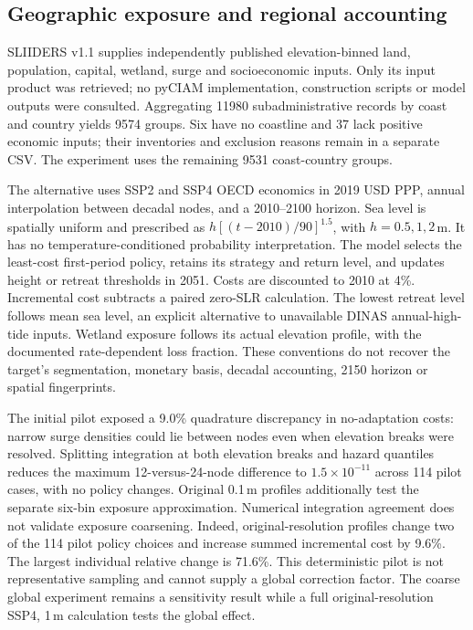 \subsection{Geographic exposure and regional accounting}
SLIIDERS v1.1 supplies independently published elevation-binned land, population,
capital, wetland, surge and socioeconomic inputs\cite{sliiders}. Only its input
product was retrieved; no pyCIAM implementation, construction scripts or model
outputs were consulted. Aggregating 11980 subadministrative records by coast
and country yields 9574 groups. Six have no coastline and 37 lack positive
economic inputs; their inventories and exclusion reasons remain in a separate
CSV. The experiment uses the remaining 9531 coast-country groups.

The alternative uses SSP2 and SSP4 OECD economics in 2019 USD PPP, annual
interpolation between decadal nodes, and a 2010--2100 horizon. Sea level is
spatially uniform and prescribed as $h[(t-2010)/90]^{1.5}$, with $h=0.5,1,2$\,m.
It has no temperature-conditioned probability interpretation. The model selects
the least-cost first-period policy, retains its strategy and return level, and
updates height or retreat thresholds in 2051. Costs are discounted to 2010 at
4\%. Incremental cost subtracts a paired zero-SLR calculation. The lowest
retreat level follows mean sea level, an explicit alternative to unavailable
DINAS annual-high-tide inputs. Wetland exposure follows its actual elevation
profile, with the documented rate-dependent loss fraction. These conventions
do not recover the target's segmentation, monetary basis, decadal accounting,
2150 horizon or spatial fingerprints.

The initial pilot exposed a 9.0\% quadrature discrepancy in no-adaptation costs:
narrow surge densities could lie between nodes even when elevation breaks
were resolved. Splitting integration at both elevation breaks and hazard
quantiles reduces the maximum 12-versus-24-node difference to
$1.5\times10^{-11}$ across 114 pilot cases, with no policy changes. Original
0.1\,m profiles additionally test the separate six-bin exposure approximation.
Numerical integration agreement does not validate exposure coarsening.
Indeed, original-resolution profiles change two of the 114 pilot policy choices
and increase summed incremental cost by 9.6\%. The largest individual relative
change is 71.6\%. This deterministic pilot is not representative sampling and
cannot supply a global correction factor. The coarse global experiment remains
a sensitivity result while a full original-resolution SSP4, 1\,m calculation
tests the global effect.

